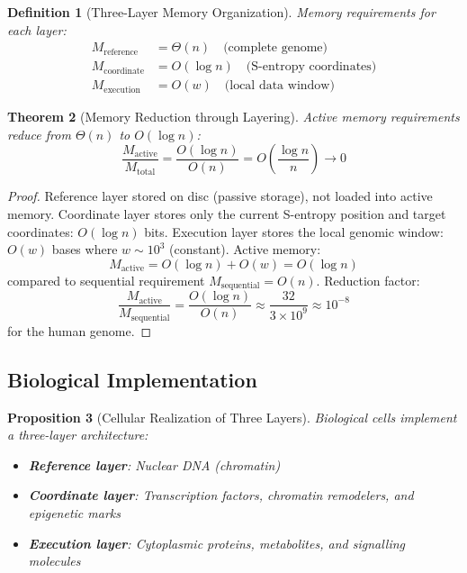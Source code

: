 \documentclass[11pt,a4paper]{article}
\newtheorem{theorem}{Theorem}[section]
\newtheorem{definition}[theorem]{Definition}
\newtheorem{proposition}[theorem]{Proposition}
\theoremstyle{remark}
\begin{document}
\begin{definition}[Three-Layer Memory Organization]
\label{def:memory_hierarchy}
Memory requirements for each layer:
\begin{align}
M_{\text{reference}} &= \Theta(n) \quad \text{(complete genome)} \\
M_{\text{coordinate}} &= O(\log n) \quad \text{(S-entropy coordinates)} \\
M_{\text{execution}} &= O(w) \quad \text{(local data window)}
\end{align}
\end{definition}

\begin{theorem}[Memory Reduction through Layering]
\label{thm:memory_reduction_layering}
Active memory requirements reduce from $\Theta(n)$ to $O(\log n)$:
\begin{equation}
\frac{M_{\text{active}}}{M_{\text{total}}} = \frac{O(\log n)}{O(n)} = O\left(\frac{\log n}{n}\right) \to 0
\end{equation}
\end{theorem}

\begin{proof}
Reference layer stored on disc (passive storage), not loaded into active memory. Coordinate layer stores only the current S-entropy position and target coordinates: $O(\log n)$ bits. Execution layer stores the local genomic window: $O(w)$ bases where $w \sim 10^3$ (constant). Active memory:
\begin{equation}
M_{\text{active}} = O(\log n) + O(w) = O(\log n)
\end{equation}
compared to sequential requirement $M_{\text{sequential}} = O(n)$. Reduction factor:
\begin{equation}
\frac{M_{\text{active}}}{M_{\text{sequential}}} = \frac{O(\log n)}{O(n)} \approx \frac{32}{3 \times 10^9} \approx 10^{-8}
\end{equation}
for the human genome.
\end{proof}

\subsection{Biological Implementation}

\begin{proposition}[Cellular Realization of Three Layers]
\label{prop:cellular_realization}
Biological cells implement a three-layer architecture:
\begin{itemize}
\item \textbf{Reference layer}: Nuclear DNA (chromatin)
\item \textbf{Coordinate layer}: Transcription factors, chromatin remodelers, and epigenetic marks
\item \textbf{Execution layer}: Cytoplasmic proteins, metabolites, and signalling molecules
\end{itemize}
\end{proposition}
\end{document}
